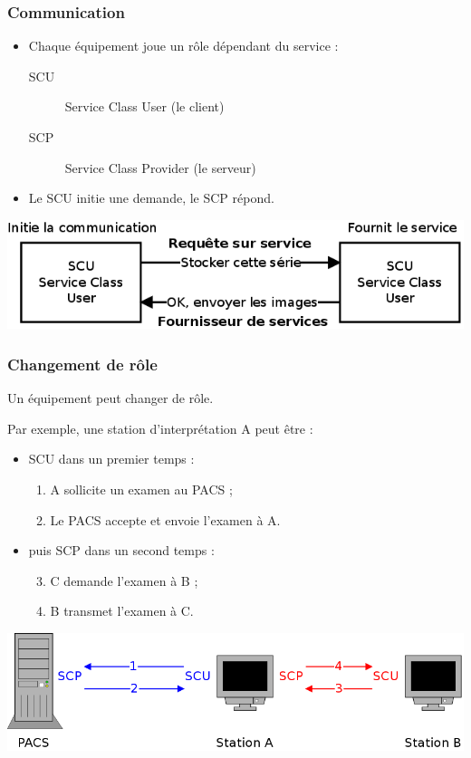 \frame
{
	\frametitle{Communication}
	\begin{itemize}
		\item Chaque \'equipement joue un r\^ole d\'ependant du service :
		\begin{description}
			\item[SCU] Service Class User (le client)
			\item[SCP] Service Class Provider (le serveur)
		\end{description}
		\item Le SCU initie une demande, le SCP r\'epond.
	\end{itemize}
	
	\begin{center}
		\includegraphics[width=.8\linewidth]{./figures/scu-scp.png}
	\end{center}
}

\frame
{
	\frametitle{Changement de r\^ole}
	Un \'equipement peut changer de r\^ole.
	
	Par exemple, une station d'interpr\'etation A peut \^etre :
	\begin{itemize}
		\item SCU dans un premier temps :
		\begin{enumerate}
			\item A sollicite un examen au PACS ;
			\item Le PACS accepte et envoie l'examen \`a A.
		\end{enumerate}
		\item puis SCP dans un second temps :
		\begin{enumerate}
		\setcounter{enumi}{2}
			\item C demande l'examen \`a B ;
			\item B transmet l'examen \`a C.
		\end{enumerate}
	\end{itemize}
	
	\includegraphics[width=\linewidth]{./figures/roles.png}
}

